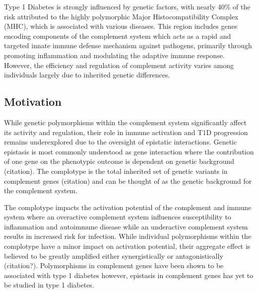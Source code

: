 \documentclass{article}\usepackage[]{graphicx}\usepackage[]{color}
\begin{document}
\par
Type 1 Diabetes is strongly influenced by genetic factors, with nearly 40\% of the risk attributed to the highly polymorphic Major Histocompatibility Complex (MHC), which is associated with various diseases. This region includes genes encoding components of the complement system which acts as a rapid and targeted innate immune defense mechanism against pathogens, primarily through promoting inflammation and modulating the adaptive immune response. However, the efficiency and regulation of complement activity varies among individuals largely due to inherited genetic differences.

\subsection{Motivation}
While genetic polymorphisms within the complement system significantly affect its activity and regulation, their role in immune activation and T1D progression remains underexplored due to the oversight of epistatic interactions. Genetic epistasis is most commonly understood as gene interaction where the contribution of one gene on the phenotypic outcome is dependent on genetic background (citation). The complotype is the total inherited set of genetic variants in complement genes (citation) and can be thought of as the genetic background for the complement system. 
\par
The complotype impacts the activation potential of the complement and immune system where an overactive complement system influences susceptibility to inflammation and autoimmune disease while an underactive complement system results in increased risk for infection. While individual polymorphisms within the complotype have a minor impact on activation potential, their aggregate effect is believed to be greatly amplified either synergistically or antagonistically (citation?). Polymorphisms in complement genes have been shown to be associated with type 1 diabetes however, epistasis in complement genes has yet to be studied in type 1 diabetes.


\end{document}
